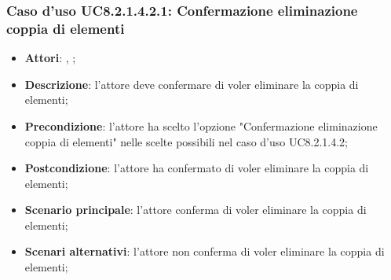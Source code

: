 		\subsubsection{Caso d'uso UC8.2.1.4.2.1: Confermazione eliminazione coppia di elementi}
		\label{UC8.2.1.4.2.1}
		\begin{itemize}
			\item \textbf{Attori}: \uau, \uaupro;
			\item \textbf{Descrizione}: l'attore deve confermare di voler eliminare la coppia di elementi;
			\item \textbf{Precondizione}: l'attore ha scelto l'opzione "Confermazione eliminazione coppia di elementi" nelle scelte possibili nel caso d'uso UC8.2.1.4.2;
			\item \textbf{Postcondizione}: l'attore ha confermato di voler eliminare la coppia di elementi;
			\item \textbf{Scenario principale}: l'attore conferma di voler eliminare la coppia di elementi;
			\item \textbf{Scenari alternativi}: l'attore non conferma di voler eliminare la coppia di elementi; 
		\end{itemize}
	
